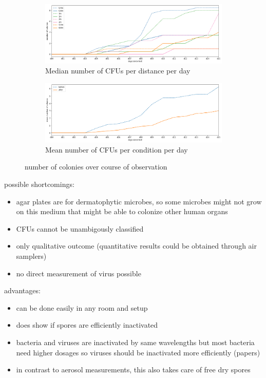 \documentclass[hyperref]{labbook}
\begin{document}
\begin{figure}[H]
\begin{subfigure}{\textwidth}
\includegraphics[scale=0.5]{CFU_per_day}
\caption{Median number of CFUs per distance per day}
\end{subfigure}
\begin{subfigure}{\textwidth}
\includegraphics[scale=0.5]{mean_CFU_per_day}
\caption{Mean number of CFUs per condition per day}
\end{subfigure}
\caption{number of colonies over course of observation}
\end{figure}

possible shortcomings:
\begin{itemize}
\item agar plates are for dermatophytic microbes, so some microbes might not grow on this medium that might be able to colonize other human organs
\item CFUs cannot be unambigously classified
\item only qualitative outcome (quantitative results could be obtained through air samplers)
\item no direct measurement of virus possible
\end{itemize}
advantages:
\begin{itemize}
\item can be done easily in any room and setup
\item does show if spores are efficiently inactivated
\item bacteria and viruses are inactivated by same wavelengths but most bacteria need higher dosages so viruses should be inactivated more efficiently (papers)
\item in contrast to aerosol measurements, this also takes care of free dry spores
\end{itemize}
\end{document}
